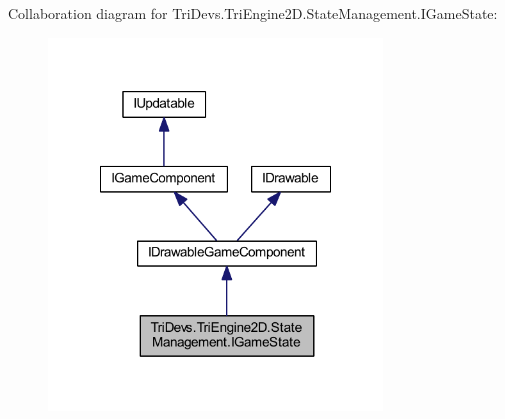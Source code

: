 Collaboration diagram for Tri\-Devs.\-Tri\-Engine2\-D.\-State\-Management.\-I\-Game\-State\-:
\nopagebreak
\begin{figure}[H]
\begin{center}
\leavevmode
\includegraphics[width=251pt]{interface_tri_devs_1_1_tri_engine2_d_1_1_state_management_1_1_i_game_state__coll__graph}
\end{center}
\end{figure}
